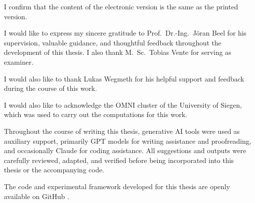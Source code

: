 \documentclass[12pt,a4paper]{article}
\newcommand{\titlepagefont}{\ebgaramond}
\begin{document}
\begin{titlepage}
    \vspace{0.8cm}

    \noindent
    I confirm that the content of the electronic version is the same as the printed version.

    \vspace*{\fill}
\end{titlepage}


\clearpage
{%
\thispagestyle{empty}
\titlepagefont

\vspace*{\fill}


\vspace{1.0cm}

\noindent
I would like to express my sincere gratitude to Prof.\ Dr.-Ing.\ J\"oran Beel for his supervision, valuable guidance, and thoughtful feedback throughout the development of this thesis. I also thank M.\ Sc.\ Tobias Vente for serving as examiner.

\vspace{0.8cm}

\noindent
I would also like to thank Lukas Wegmeth for his helpful support and feedback during the course of this work.

\vspace{0.8cm}

\noindent
I would also like to acknowledge the OMNI cluster of the University of Siegen, which was used to carry out the computations for this work.

\vspace{0.8cm}

\noindent
Throughout the course of writing this thesis, generative AI tools were used as auxiliary support, primarily GPT models for writing assistance and proofreading, and occasionally Claude for coding assistance. All suggestions and outputs were carefully reviewed, adapted, and verified before being incorporated into this thesis or the accompanying code.

\vspace{0.8cm}

\noindent
The code and experimental framework developed for this thesis are openly available on GitHub \cite{repo}.

\vspace*{\fill}
}
\end{document}
